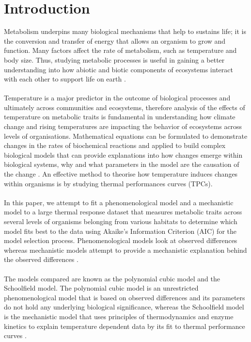 \section*{Introduction}

Metabolism underpins many biological mechanisms that help to sustains life; it is the conversion and transfer of energy that allows an organism to grow and function. Many factors affect the rate of metabolism, such as temperature and body size. Thus, studying metabolic processes is useful in gaining a better understanding into how abiotic and biotic components of ecosystems interact with each other to support life on earth \citep{Brown2004}.   
\\~\\
Temperature is a major predictor in the outcome of biological processes and ultimately across communities and ecosystems, therefore analysis of the effects of temperature on metabolic traits is fundamental in understanding how climate change and rising temperatures are impacting the behavior of ecosystems across levels of organisations. Mathematical equations can be formulated to demonstrate changes in the rates of biochemical reactions and applied to build complex biological models that can provide explanations into how changes emerge within biological systems, why and what parameters in the model are the causation of the change \citep{Transtrum2016}. An effective method to theorise how temperature induces changes within organisms is by studying thermal performances curves (TPCs).  
\\~\\
In this paper, we attempt to fit a phenomenological model and a mechanistic model to a large thermal response dataset that measures metabolic traits across several levels of organisms belonging from various habitats to determine which model fits best to the data using Akaike's Information Criterion (AIC) for the model selection process.  Phenomenological models look at observed differences whereas mechanistic models attempt to provide a mechanistic explanation behind the observed differences \citep{Rodrigue2010}.  
\\~\\
The models compared are known as the polynomial cubic model and the Schoolfield model.  The polynomial cubic model is an unrestricted phenomenological model that is based on observed differences and its parameters do not hold any underlying biological significance, whereas the Schoolfield model is the mechanistic model that uses principles of thermodynamics and enzyme kinetics to explain temperature dependent data by its fit to thermal performance curves \citep{Kontopoulos2018}. 
